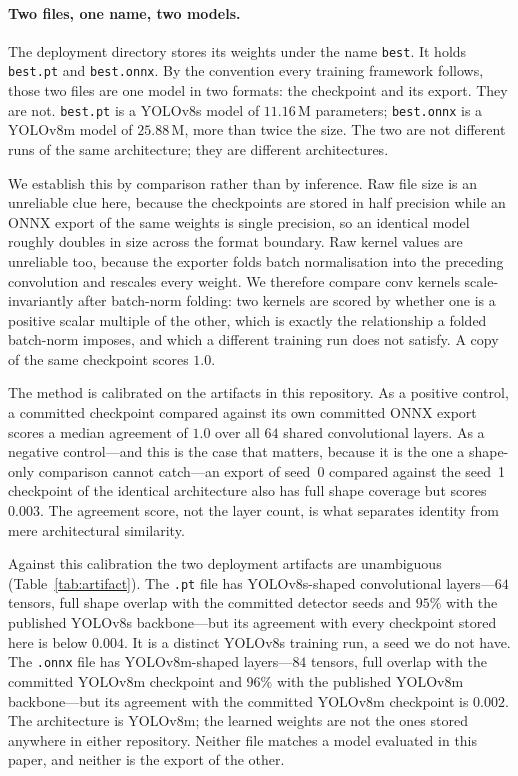 \paragraph{Two files, one name, two models.} The deployment directory stores its
weights under the name \texttt{best}. It holds \texttt{best.pt} and
\texttt{best.onnx}. By the convention every training
framework follows, those two files are one model in two formats: the checkpoint
and its export. They are not. \texttt{best.pt} is a YOLOv8s model of
$11.16$\,M parameters; \texttt{best.onnx} is a YOLOv8m model of $25.88$\,M, more
than twice the size. The two are not different runs of the same architecture; they
are different architectures.

We establish this by comparison rather than by inference. Raw file size is an
unreliable clue here, because the checkpoints are stored in half precision while an
ONNX export of the same weights is single precision, so an identical model roughly
doubles in size across the format boundary. Raw kernel values are unreliable too,
because the exporter folds batch normalisation into the preceding convolution and
rescales every weight. We therefore compare conv kernels scale-invariantly after
batch-norm folding: two kernels are scored by whether one is a positive scalar
multiple of the other, which is exactly the relationship a folded batch-norm
imposes, and which a different training run does not satisfy. A copy of the same
checkpoint scores $1.0$.

The method is calibrated on the artifacts in this repository. As a positive
control, a committed checkpoint compared against its own committed ONNX export
scores a median agreement of $1.0$ over all $64$ shared convolutional layers. As a
negative control---and this is the case that matters, because it is the one a
shape-only comparison cannot catch---an export of seed~0 compared against the
seed~1 checkpoint of the identical architecture also has full shape coverage but
scores $0.003$. The agreement score, not the layer count, is what separates
identity from mere architectural similarity.

Against this calibration the two deployment artifacts are unambiguous
(Table~\ref{tab:artifact}). The \texttt{.pt} file has YOLOv8s-shaped convolutional
layers---$64$ tensors, full shape overlap with the committed detector seeds and
$95\%$ with the published YOLOv8s backbone---but its agreement with every
checkpoint stored here is below $0.004$. It is a distinct YOLOv8s training run,
a seed we do not have. The \texttt{.onnx} file has YOLOv8m-shaped layers---$84$
tensors, full overlap with the committed YOLOv8m checkpoint and $96\%$ with the
published YOLOv8m backbone---but its agreement with the committed YOLOv8m
checkpoint is $0.002$. The architecture is YOLOv8m; the learned weights are not
the ones stored anywhere in either repository. Neither file matches a model
evaluated in this paper, and neither is the export of the other.

